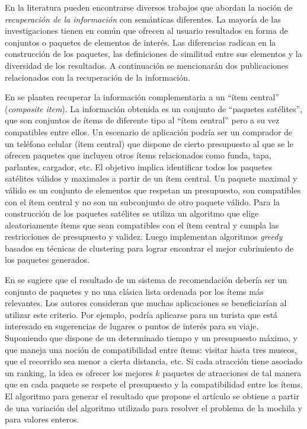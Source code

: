 En la literatura pueden encontrarse diversos trabajos que abordan la noción de \emph{recuperación de la información} con semánticas diferentes. La mayoría de las investigaciones tienen en común que ofrecen al usuario resultados en forma de conjuntos o paquetes de elementos de interés. Las diferencias radican en la construcción de los paquetes, las definiciones de similitud entre sus elementos y la diversidad de los resultados. A continuación se mencionarán dos publicaciones relacionados con la recuperación de la información.

En \cite{BasuRoy:2010:CEC:1807167.1807258} se plantea recuperar la información complementaria a un ``ítem central'' (\textit{composite item}). La información obtenida es un conjunto de ``paquetes satélites'', que son conjuntos de ítems de diferente tipo al ``ítem central'' pero a su vez compatibles entre ellos. Un escenario de aplicación podría ser un comprador de un teléfono celular (ítem central) que dispone de cierto presupuesto al que se le ofrecen paquetes que incluyen otros ítems relacionados como funda, tapa, parlantes, cargador, etc. El objetivo implica identificar todos los paquetes satélites válidos y maximales a partir de un ítem central. Un paquete maximal y válido es un conjunto de elementos que respetan un presupuesto, son compatibles con el ítem central y no son un subconjunto de otro paquete válido. Para la construcción de los paquetes satélites se utiliza un algoritmo que elige aleatoriamente ítems que sean compatibles con el ítem central y cumpla las restricciones de presupuesto y validez. Luego implementan algoritmos \emph{greedy} basados en técnicas de clustering para lograr encontrar el mejor cubrimiento de los paquetes generados.

En \cite{Xie:2010:BOB:1864708.1864739} se sugiere que el resultado de un sistema de recomendación debería ser un conjunto de paquetes y no una clásica lista ordenada por los ítems más relevantes. Los autores consideran que muchas aplicaciones se beneficiarían al utilizar este criterio. Por ejemplo, podría aplicarse para un turista que está interesado en sugerencias de lugares o puntos de interés para su viaje. Suponiendo que dispone de un determinado tiempo y un presupuesto máximo, y que maneja una noción de compatibilidad entre ítems: visitar hasta tres museos, que el recorrido sea menor a cierta distancia, etc. Si cada atracción tiene asociado un ranking, la idea es ofrecer los mejores $k$ paquetes de atracciones de tal manera que en cada paquete se respete el presupuesto y la compatibilidad entre los ítems. El algoritmo para generar el resultado que propone el artículo se obtiene a partir de una variación del algoritmo utilizado para resolver el problema de la mochila \cite{DBLP:conf/coco/Karp72} y \cite{Gossett:2009:DMP:1717238} para valores enteros. 

